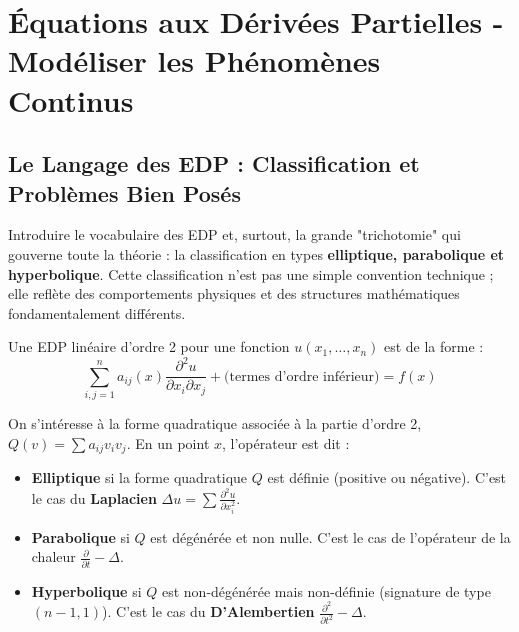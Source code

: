 \chapter{Équations aux Dérivées Partielles - Modéliser les Phénomènes Continus}

\section{Le Langage des EDP : Classification et Problèmes Bien Posés}

\begin{objectif}
    Introduire le vocabulaire des EDP et, surtout, la grande "trichotomie" qui gouverne toute la théorie : la classification en types \textbf{elliptique, parabolique et hyperbolique}. Cette classification n'est pas une simple convention technique ; elle reflète des comportements physiques et des structures mathématiques fondamentalement différents.
\end{objectif}

\begin{definition}
    Une EDP linéaire d'ordre 2 pour une fonction $u(x_1, \dots, x_n)$ est de la forme :
    $$ \sum_{i,j=1}^n a_{ij}(x) \frac{\partial^2 u}{\partial x_i \partial x_j} + \text{(termes d'ordre inférieur)} = f(x) $$
\end{definition}

\begin{proposition}[Classification]
    On s'intéresse à la forme quadratique associée à la partie d'ordre 2, $Q(v) = \sum a_{ij} v_i v_j$. En un point $x$, l'opérateur est dit :
    \begin{itemize}
        \item \textbf{Elliptique} si la forme quadratique $Q$ est définie (positive ou négative). C'est le cas du \textbf{Laplacien} $\Delta u = \sum \frac{\partial^2 u}{\partial x_i^2}$.
        \item \textbf{Parabolique} si $Q$ est dégénérée et non nulle. C'est le cas de l'opérateur de la chaleur $\frac{\partial}{\partial t} - \Delta$.
        \item \textbf{Hyperbolique} si $Q$ est non-dégénérée mais non-définie (signature de type $(n-1,1)$). C'est le cas du \textbf{D'Alembertien} $\frac{\partial^2}{\partial t^2} - \Delta$.
    \end{itemize}
\end{proposition}

